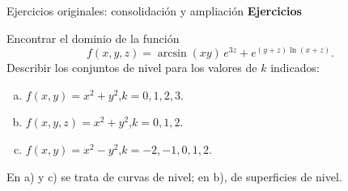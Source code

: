 \documentclass[main.tex]{subfiles}
\begin{document}
\begin{frame}{Ejercicios originales: consolidación y ampliación}
\small\textbf{Ejercicios}
\medskip

Encontrar el dominio de la función
\[f(x,y,z)=\arcsin(xy)\,e^{3z}+e^{(y+z)\ln(x+z)}.\]
Describir los conjuntos de nivel para los valores de $k$ indicados:
\begin{enumerate}[a)]
\item $f(x,y)=x^2+y^2$,\quad $k=0,1,2,3$.
\item $f(x,y,z)=x^2+y^2$,\quad $k=0,1,2$.
\item $f(x,y)=x^2-y^2$,\quad $k=-2,-1,0,1,2$.
\end{enumerate}
En a) y c) se trata de curvas de nivel; en b), de superficies de nivel.
\end{frame}
\end{document}
